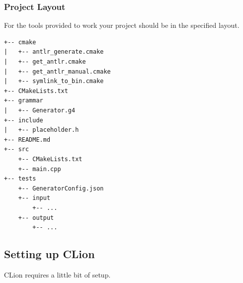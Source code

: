 \documentclass{article}
\begin{document}
\subsubsection{Project Layout}
For the tools provided to work your project should be in the specified layout.
\begin{lstlisting}
+-- cmake
|   +-- antlr_generate.cmake
|   +-- get_antlr.cmake
|   +-- get_antlr_manual.cmake
|   +-- symlink_to_bin.cmake
+-- CMakeLists.txt
+-- grammar
|   +-- Generator.g4
+-- include
|   +-- placeholder.h
+-- README.md
+-- src
    +-- CMakeLists.txt
    +-- main.cpp
+-- tests
    +-- GeneratorConfig.json
    +-- input
        +-- ...
    +-- output
        +-- ...
\end{lstlisting}

\subsection{Setting up CLion}
CLion requires a little bit of setup.
\end{document}
